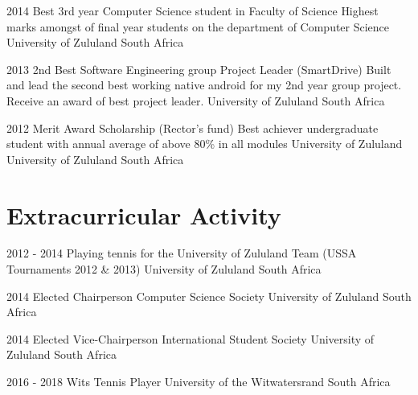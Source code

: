 \documentclass[11pt, letterpaper]{moderncv}        %
\begin{document}
\cventry
{2014}
{Best 3rd year Computer Science student in Faculty of Science}
{Highest marks amongst of final year students on the department of Computer Science}
{University of Zululand}
{South Africa}
{}


\cventry
{2013}
{2nd Best Software Engineering group Project Leader (SmartDrive)}
{Built and lead the second best working native android for my 2nd year group project. Receive an award of best project leader.}
{University of Zululand}
{South Africa}
{}

\cventry
{2012}
{Merit Award Scholarship (Rector’s fund)}
{Best achiever undergraduate student with annual average of above 80\% in all modules}
{University of Zululand}
{University of Zululand}
{South Africa}
{}

\section{Extracurricular Activity}
\cventry
{2012 - 2014}
{Playing tennis for the University of Zululand Team (USSA Tournaments 2012 \& 2013)}
{University	of Zululand}
{South Africa}
{}
{}

\cventry
{2014}
{Elected Chairperson Computer Science Society}
{University	of Zululand}
{South Africa}
{}
{}

\cventry
{2014}
{Elected Vice-Chairperson International Student Society}
{University	of Zululand}
{South Africa}
{}
{}

\cventry
{2016 - 2018}
{Wits Tennis Player}
{University	of the Witwatersrand}
{South Africa}
{}
{}
\end{document}
